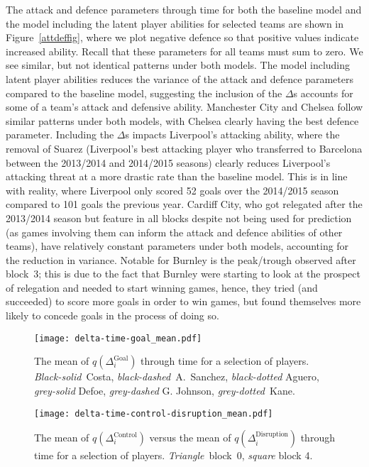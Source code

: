 \documentclass[11pt,a4paper]{article}
\begin{document}
The attack and defence parameters through time 
for both the baseline model and the model including the latent player 
abilities for selected teams are shown in Figure~\ref{attdeffig}, where 
we plot negative defence so that positive values indicate increased 
ability. Recall that these parameters for all teams must sum to zero. 
We see similar, but not identical patterns under both models. The 
model including latent player abilities reduces the variance of the 
attack and defence parameters compared to the baseline model, 
suggesting the inclusion of the $\Delta$s accounts for some of a 
team's attack and defensive ability. Manchester City and Chelsea follow 
similar patterns under both models, with Chelsea clearly having the 
best defence parameter. Including the $\Delta$s impacts Liverpool's 
attacking ability, where the removal of Suarez (Liverpool's best 
attacking player who transferred to Barcelona between the 2013/2014 
and 2014/2015 seasons) clearly reduces Liverpool's attacking threat at 
a more drastic rate than the baseline model. This is in line with 
reality, where Liverpool only scored 52 goals over the 2014/2015 season 
compared to 101 goals the previous year. Cardiff City, who got 
relegated after the 2013/2014 season but feature in all blocks despite 
not being used for prediction (as games involving them can inform 
the attack and defence abilities of other teams), have relatively 
constant parameters under both models, accounting for the reduction in 
variance. Notable for Burnley is the peak/trough observed after 
block~3; this is due to the fact that Burnley were starting to look at 
the prospect of relegation and needed to start winning games, hence, 
they tried (and succeeded) to score more goals in order to win games, 
but found themselves more likely to concede goals in the process of 
doing so.  
    


\begin{figure}[t]
      \centering
      \texttt{[image: delta-time-goal\_mean.pdf]}
      \caption{The mean of $q(\Delta_i^{\textrm{Goal}})$ through time for a selection of players. \hbox{\emph{Black-solid} Costa}, \hbox{\emph{black-dashed} A. Sanchez}, \emph{black-dotted} Aguero, \emph{grey-solid} Defoe, \emph{grey-dashed} G. Johnson, \hbox{\emph{grey-dotted} Kane}.} \label{goaltimefig}
\end{figure} 

\begin{figure}%
      \centering
      \texttt{[image: delta-time-control-disruption\_mean.pdf]}
      \caption{The mean of $q(\Delta_i^{\textrm{Control}})$ versus the mean of $q(\Delta_i^{\textrm{Disruption}})$ through time for a selection of players. \hbox{\emph{Triangle} block 0}, \emph{square} block 4.} \label{controltimefig} 
\end{figure} 
\end{document}
